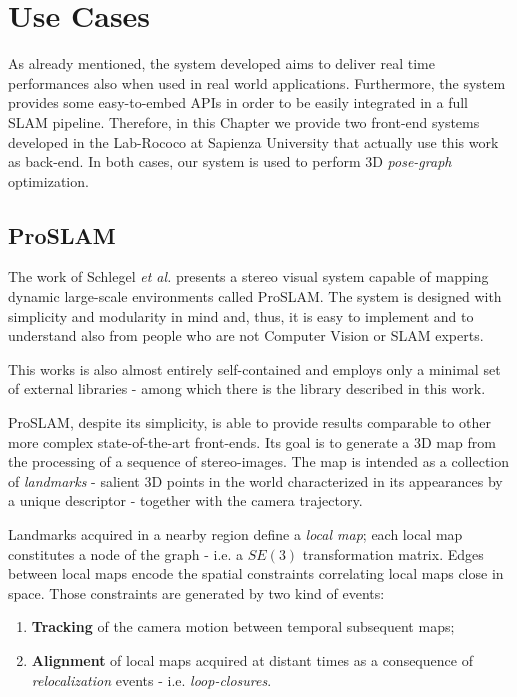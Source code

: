 \chapter{Use Cases}\label{ch:cases}
As already mentioned, the system developed aims to deliver real time performances also when used in real world applications. Furthermore, the system provides some easy-to-embed APIs in order to be easily integrated in a full SLAM pipeline. Therefore, in this Chapter we provide two front-end systems developed in the Lab-Rococo at Sapienza University that actually use this work as back-end. In both cases, our system is used to perform 3D \textit{pose-graph} optimization.

\section{ProSLAM}\label{sec:proslam}
The work of Schlegel \textit{et al.} \cite{schlegel2017proslam} presents a stereo visual system capable of mapping dynamic large-scale environments called ProSLAM. The system is designed with simplicity and modularity in mind and, thus, it is easy to implement and to understand also from people who are not Computer Vision or SLAM experts.

This works is also almost entirely self-contained and employs only a minimal set of external libraries - among which there is the library described in this work.

ProSLAM, despite its simplicity, is able to provide results comparable to other more complex state-of-the-art front-ends. Its goal is to generate a 3D map from the processing of a sequence of stereo-images. The map is intended as a collection of \textit{landmarks} - salient 3D points in the world characterized in its appearances by a unique descriptor - together with the camera trajectory. 

Landmarks acquired in a nearby region define a \textit{local map}; each local map constitutes a node of the graph - i.e. a $SE(3)$ transformation matrix. Edges between local maps encode the spatial constraints correlating local maps close in space. Those constraints are generated by two kind of events:

\begin{enumerate}
    \item \textbf{Tracking} of the camera motion between temporal subsequent maps;
    \item \textbf{Alignment} of local maps acquired at distant times as a consequence of \textit{relocalization} events - i.e. \textit{loop-closures}.
\end{enumerate}

